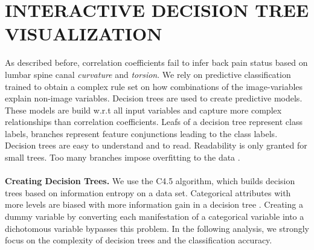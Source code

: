 \documentclass[a4paper,twoside]{style/article}
\begin{document}
\section{\uppercase{Interactive Decision Tree Visualization}}
\label{sec:DecisionTrees}
\noindent As described before, correlation coefficients fail to infer back pain status based on lumbar spine canal \emph{curvature} and \emph{torsion}.
We rely on predictive classification trained to obtain a complex rule set on how combinations of the image-variables explain non-image variables.
Decision trees are used to create predictive models.
These models are build w.r.t all input variables and capture more complex relationships than correlation coefficients.
Leafs of a decision tree represent class labels, branches represent feature conjunctions leading to the class labels.
Decision trees are easy to understand and to read.
Readability is only granted for small trees.
Too many branches impose overfitting to the data \cite{DecisionTree}.
\\\\
\noindent \textbf{Creating Decision Trees.}
We use the C4.5 algorithm, which builds decision trees based on information entropy on a data set.
Categorical attributes with more levels are biased with more information gain in a decision tree \cite{deng2011bias}.
Creating a dummy variable by converting each manifestation of a categorical variable into a dichotomous variable bypasses this problem.
In the following analysis, we strongly focus on the complexity of decision trees and the classification accuracy.
%
\end{document}
